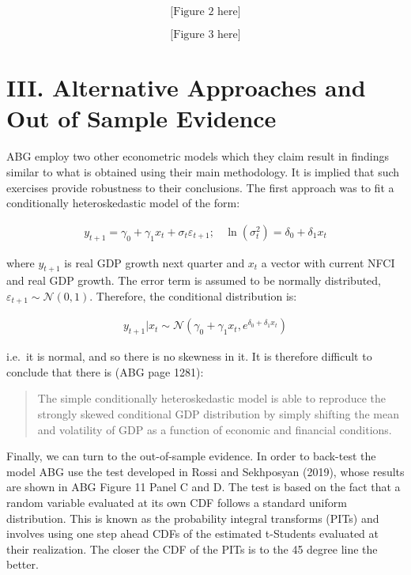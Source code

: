 \documentclass[12pt,]{article}
\begin{document}
\[
\text{[Figure 2 here]}
\]

\[
\text{[Figure 3 here]}
\]

\hypertarget{iii.-alternative-approaches-and-out-of-sample-evidence}{%
\section{III. Alternative Approaches and Out of Sample
Evidence}\label{iii.-alternative-approaches-and-out-of-sample-evidence}}

ABG employ two other econometric models which they claim result in
findings similar to what is obtained using their main methodology. It is
implied that such exercises provide robustness to their conclusions. The
first approach was to fit a conditionally heteroskedastic model of the
form:

\begin{align}
y_{t+1} = \gamma_0 + \gamma_1 x_t + \sigma_t\varepsilon_{t+1}; \ \ \ \ \ln(\sigma^2_t) = \delta_0 + \delta_1 x_t
\end{align}

where \(y_{t+1}\) is real GDP growth next quarter and \(x_t\) a vector
with current NFCI and real GDP growth. The error term is assumed to be
normally distributed, \(\varepsilon_{t+1} \sim \mathcal{N}(0,1)\).
Therefore, the conditional distribution is:

\begin{align}
y_{t+1}|x_t \sim \mathcal{N}(\gamma_0 + \gamma_1 x_t, e^{\delta_0 + \delta_1 x_t})
\end{align}

i.e.~it is normal, and so there is no skewness in it. It is therefore
difficult to conclude that there is (ABG page 1281):

\begin{quote}
The simple conditionally heteroskedastic model is able to reproduce the
strongly skewed conditional GDP distribution by simply shifting the mean
and volatility of GDP as a function of economic and financial
conditions.
\end{quote}

Finally, we can turn to the out-of-sample evidence. In order to
back-test the model ABG use the test developed in Rossi and Sekhposyan
(2019), whose results are shown in ABG Figure 11 Panel C and D. The test
is based on the fact that a random variable evaluated at its own CDF
follows a standard uniform distribution. This is known as the
probability integral transforms (PITs) and involves using one step ahead
CDFs of the estimated t-Students evaluated at their realization. The
closer the CDF of the PITs is to the 45 degree line the better.
\end{document}
